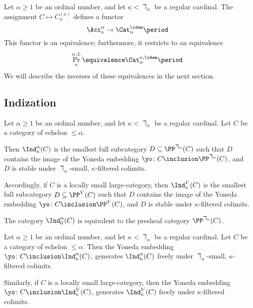 \begin{nul}%
	\label{nul:thetafromAcctoCat}
	Let $ \alpha \geq 1 $ be an ordinal number,
	and let $ \kappa < \daleth_{\alpha} $ be a regular cardinal.
	The assignment $ C \mapsto C^{(\kappa)}_{\alpha} $
	defines a functor
	\[ \Acc_{\kappa}^{\alpha} \to \Cat^{\idem}_{\alpha} \period \]
	This functor is an equivalence;
	furthermore, it restricts to an equivalence
	\[
		\Pr^{\alpha,L}_{\kappa} \equivalence
		\Cat^{\kappa,\idem}_{\alpha} \period
	\]
	We will describe the inverses of these equivalences in the next section.
\end{nul}

\subsection{Indization}%
\label{sub:indization}

\begin{definition}
	Let $ \alpha \geq 1 $ be an ordinal number, and
	let $ \kappa < \daleth_{\alpha} $ be a regular cardinal.
	Let $ C $ be a category of echelon $ \leq \alpha $.

	Then $ \Ind_{\kappa}^{\alpha}(C) $ is
	the smallest full subcategory $ D \subseteq \PP^{\daleth_{\alpha}}(C) $
	such that $ D $ contains the image
	of the Yoneda embedding
	$ \yo \colon C \inclusion \PP^{\daleth_{\alpha}}(C) $,
	and $ D $ is stable under
	$ \daleth_{\alpha} $-small, $ \kappa $-filtered colimits.

	Accordingly, if $ C $ is a locally small large-category,
	then $ \Ind_{\kappa}^V(C) $ is
	the smallest full subcategory $ D \subseteq \PP^V(C) $
	such that $ D $ contains the image
	of the Yoneda embedding
	$ \yo \colon C \inclusion \PP^V(C) $,
	and $ D $ is stable under $ \kappa $-filtered colimits.
\end{definition}

\begin{eg}
	The category $ \Ind_{0}^{\alpha}(C) $ is 
	equivalent to the presheaf category
	$ \PP^{\daleth_{\alpha}}(C) $.
\end{eg}

\begin{proposition}
	Let $ \alpha \geq 1 $ be an ordinal number, and
	let $ \kappa < \daleth_{\alpha} $ be a regular cardinal.
	Let $ C $ be a category of echelon $ \leq \alpha $.
	Then the Yoneda embedding
	$ \yo \colon C \inclusion \Ind_{\kappa}^{\alpha}(C) $,
	generates $ \Ind_{\kappa}^{\alpha}(C) $ freely under
	$ \daleth_{\alpha} $-small, $ \kappa $-filtered colimits.

	Similarly, if $ C $ is a locally small large-category,
	then the Yoneda embedding
	$ \yo \colon C \inclusion \Ind_{\kappa}^{V}(C) $,
	generates $ \Ind_{\kappa}^{V}(C) $ freely under
	$ \kappa $-filtered colimits.
\end{proposition}


